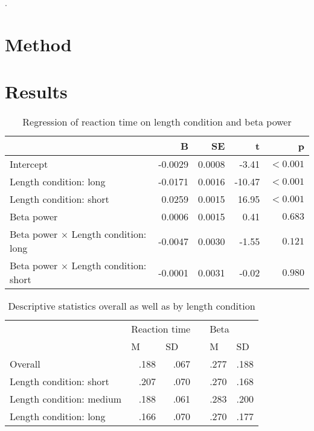 \documentclass[man]{apa6} %
\begin{document}
\cite{kononowicz_beta_nodate}.

\section{Method}
\section{Results}

\begin{table}[ht]
  \caption{Regression of reaction time on length condition and beta power}
  \centering
  \begin{tabular}{lrrrr}
    \toprule
                                                  & B        & SE         & t       & p         \\
    \midrule
    Intercept                                     & -0.0029  & 0.0008     & -3.41   & $< 0.001$ \\
    Length condition: long                        & -0.0171  & 0.0016     & -10.47  & $< 0.001$ \\
    Length condition: short                       & 0.0259   & 0.0015     & 16.95   & $< 0.001$ \\
    Beta power                                    & 0.0006   & 0.0015     & 0.41    & $0.683$   \\
    Beta power $\times$ Length condition: long    & -0.0047  & 0.0030     & -1.55   & $0.121$   \\
    Beta power $\times$ Length condition: short   & -0.0001  & 0.0031     & -0.02   & $0.980$   \\
    \bottomrule
  \end{tabular}
\end{table}

\begin{table}[ht]
  \caption{Descriptive statistics overall as well as by length condition}
  \centering
  \begin{tabular}{lrrrrr}
    \toprule
                              & \multicolumn{2}{l}{Reaction time}              && \multicolumn{2}{l}{Beta}                       \\ \cmidrule{2-3} \cmidrule{5-6}
                              & \multicolumn{1}{l}{M} & \multicolumn{1}{l}{SD} && \multicolumn{1}{l}{M} & \multicolumn{1}{l}{SD} \\
    \midrule
    Overall                   & .188                  &  .067                  && .277                  & .188                   \\
    Length condition: short   & .207                  &  .070                  && .270                  & .168                   \\
    Length condition: medium  & .188                  &  .061                  && .283                  & .200                   \\
    Length condition: long    & .166                  &  .070                  && .270                  & .177                   \\
    \bottomrule
  \end{tabular}
\end{table}
\end{document}
